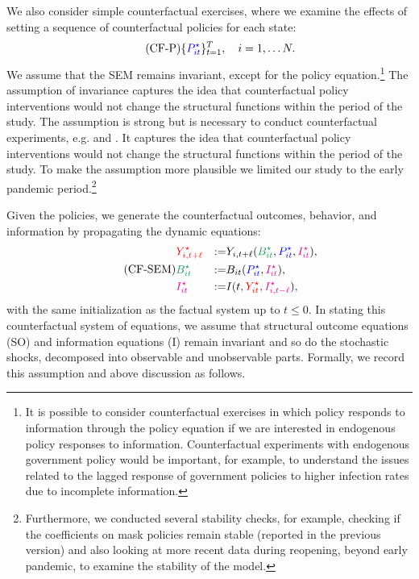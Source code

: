\documentclass[11pt,reqno,letter]{amsart}
\theoremstyle{definition}
\def\bcolor{\color{ForestGreen}}
\def\pcolor{\color{blue}}
\def\icolor{\color{magenta}}
\def\ycolor{\color{red}}
\begin{document}
We  also consider simple counterfactual exercises, where we examine the effects of setting
a sequence of counterfactual policies for each state:
\begin{equation} \label{p-cf}\tag{CF-P}
\{{\pcolor P^\star_{it}} \}_{t=1}^T, \quad i=1, \ldots N.
\end{equation}
We assume that the SEM remains invariant, except for the policy equation.\footnote{It is possible to consider counterfactual exercises in which policy  responds to information through the policy equation if we are interested in endogenous policy responses to information. Counterfactual experiments with endogenous government policy would be important, for example, to understand the issues related to the lagged response of government policies to higher infection rates due to incomplete information. } 
The assumption  of invariance captures the idea that counterfactual policy interventions would not change the structural functions within the period of the study.  The assumption is strong but is necessary to conduct
counterfactual experiments, e.g. \cite{sims1972} and \cite{strotz1960recursive}. It captures the idea that counterfactual policy interventions would not change the structural functions within the period of the study. To make the assumption more plausible we limited our study to the early pandemic period.\footnote{Furthermore, we conducted several stability checks, for example, checking if the coefficients on mask policies remain stable (reported in the previous version) and also looking at more recent data during reopening, beyond early pandemic, to examine the stability of the model.} 

Given the policies, we generate the counterfactual
outcomes, behavior, and information by propagating the dynamic equations:
\begin{equation} \label{eqn:CF-SEM} \tag{CF-SEM}
  \begin{aligned}
& {\ycolor Y^\star_{i,t+\ell}}  & := & Y_{i,t+\ell} ( {\bcolor B^\star_{it} } , {\pcolor P^\star_{it}}, {\icolor I^\star_{it}}), \\
& {\bcolor B^\star_{it} } & := &   B_{it}({\pcolor P^\star_{it} } ,{\icolor I^\star_{it}}), \\
& {\icolor I^\star_{it} }& := &  I ({ t,  {\ycolor Y^\star_{it}}, \icolor I^\star_{i,t-\ell}}),  \end{aligned}
\end{equation}
with the same initialization as the factual system up to $t \leq 0$. In stating this counterfactual system of equations, we assume that structural outcome equations (SO) and information equations (I) remain invariant and so do the stochastic shocks, decomposed
into observable and unobservable parts. Formally, we record this assumption and above discussion as follows.
\end{document}

